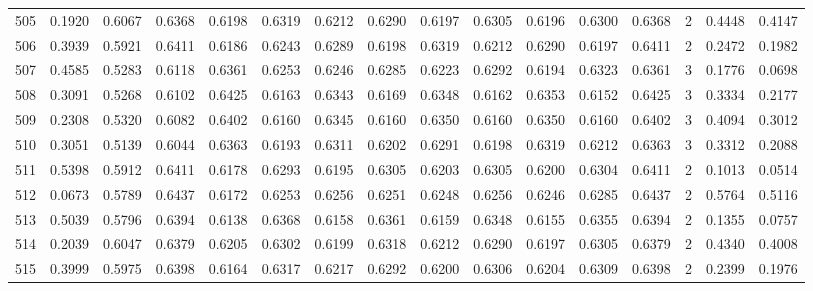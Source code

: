 \begin{tabular}{lrrrrrrrrrrrrrrr}
505 &      0.1920 &  0.6067 &  0.6368 &  0.6198 &  0.6319 &  0.6212 &  0.6290 &  0.6197 &  0.6305 &  0.6196 &   0.6300 &     0.6368 &      2 &                    0.4448 &                     0.4147 \\
506 &      0.3939 &  0.5921 &  0.6411 &  0.6186 &  0.6243 &  0.6289 &  0.6198 &  0.6319 &  0.6212 &  0.6290 &   0.6197 &     0.6411 &      2 &                    0.2472 &                     0.1982 \\
507 &      0.4585 &  0.5283 &  0.6118 &  0.6361 &  0.6253 &  0.6246 &  0.6285 &  0.6223 &  0.6292 &  0.6194 &   0.6323 &     0.6361 &      3 &                    0.1776 &                     0.0698 \\
508 &      0.3091 &  0.5268 &  0.6102 &  0.6425 &  0.6163 &  0.6343 &  0.6169 &  0.6348 &  0.6162 &  0.6353 &   0.6152 &     0.6425 &      3 &                    0.3334 &                     0.2177 \\
509 &      0.2308 &  0.5320 &  0.6082 &  0.6402 &  0.6160 &  0.6345 &  0.6160 &  0.6350 &  0.6160 &  0.6350 &   0.6160 &     0.6402 &      3 &                    0.4094 &                     0.3012 \\
510 &      0.3051 &  0.5139 &  0.6044 &  0.6363 &  0.6193 &  0.6311 &  0.6202 &  0.6291 &  0.6198 &  0.6319 &   0.6212 &     0.6363 &      3 &                    0.3312 &                     0.2088 \\
511 &      0.5398 &  0.5912 &  0.6411 &  0.6178 &  0.6293 &  0.6195 &  0.6305 &  0.6203 &  0.6305 &  0.6200 &   0.6304 &     0.6411 &      2 &                    0.1013 &                     0.0514 \\
512 &      0.0673 &  0.5789 &  0.6437 &  0.6172 &  0.6253 &  0.6256 &  0.6251 &  0.6248 &  0.6256 &  0.6246 &   0.6285 &     0.6437 &      2 &                    0.5764 &                     0.5116 \\
513 &      0.5039 &  0.5796 &  0.6394 &  0.6138 &  0.6368 &  0.6158 &  0.6361 &  0.6159 &  0.6348 &  0.6155 &   0.6355 &     0.6394 &      2 &                    0.1355 &                     0.0757 \\
514 &      0.2039 &  0.6047 &  0.6379 &  0.6205 &  0.6302 &  0.6199 &  0.6318 &  0.6212 &  0.6290 &  0.6197 &   0.6305 &     0.6379 &      2 &                    0.4340 &                     0.4008 \\
515 &      0.3999 &  0.5975 &  0.6398 &  0.6164 &  0.6317 &  0.6217 &  0.6292 &  0.6200 &  0.6306 &  0.6204 &   0.6309 &     0.6398 &      2 &                    0.2399 &                     0.1976 \\

\end{tabular}
